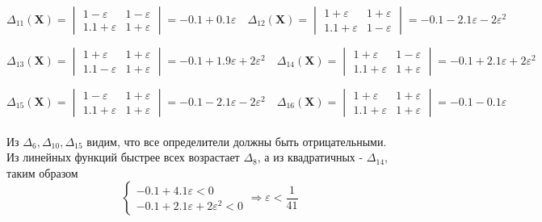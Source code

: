 \begin{equation}
\Delta_{11}(\textbf{X})=
\begin{vmatrix}
1-\varepsilon & 1-\varepsilon \\
1.1+\varepsilon & 1+\varepsilon 
\end{vmatrix}
=-0.1+0.1\varepsilon
\quad
\Delta_{12}(\textbf{X})=
\begin{vmatrix}
1+\varepsilon & 1+\varepsilon \\
1.1+\varepsilon & 1-\varepsilon 
\end{vmatrix}
=-0.1-2.1\varepsilon-2\varepsilon^2
\end{equation}

\begin{equation}
\Delta_{13}(\textbf{X})=
\begin{vmatrix}
1+\varepsilon & 1+\varepsilon \\
1.1-\varepsilon & 1+\varepsilon 
\end{vmatrix}
=-0.1+1.9\varepsilon+2\varepsilon^2
\quad
\Delta_{14}(\textbf{X})=
\begin{vmatrix}
1+\varepsilon & 1-\varepsilon \\
1.1+\varepsilon & 1+\varepsilon 
\end{vmatrix}
=-0.1+2.1\varepsilon+2\varepsilon^2
\end{equation}

\begin{equation}
\Delta_{15}(\textbf{X})=
\begin{vmatrix}
1-\varepsilon & 1+\varepsilon \\
1.1+\varepsilon & 1+\varepsilon 
\end{vmatrix}
=-0.1-2.1\varepsilon-2\varepsilon^2
\quad
\Delta_{16}(\textbf{X})=
\begin{vmatrix}
1+\varepsilon & 1+\varepsilon \\
1.1+\varepsilon & 1+\varepsilon 
\end{vmatrix}
=-0.1-0.1\varepsilon
\end{equation}\\
Из $\Delta_{6}, \Delta_{10}, \Delta_{15}$ видим, что все определители должны быть отрицательными.\\
Из линейных функций быстрее всех возрастает $\Delta_{8}$, а из квадратичных - $\Delta_{14}$, таким образом
\begin{equation*}
 \begin{cases}
   -0.1+4.1\varepsilon < 0\\
   -0.1+2.1\varepsilon+2\varepsilon^2 < 0
 \end{cases}
 \Rightarrow 
 \varepsilon<\frac{1}{41}
\end{equation*}

